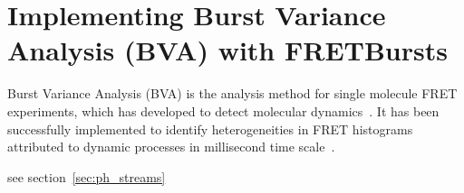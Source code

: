 \section{Implementing Burst Variance Analysis (BVA) with FRETBursts}


Burst Variance Analysis (BVA) is the analysis method for single molecule FRET experiments, which has developed to detect molecular dynamics~\cite{Torella_2011}. It has been successfully implemented to identify heterogeneities in FRET histograms attributed to dynamic processes in millisecond time scale~\cite{Torella_2011, Robb_2013}.

see section~\ref{sec:ph_streams}